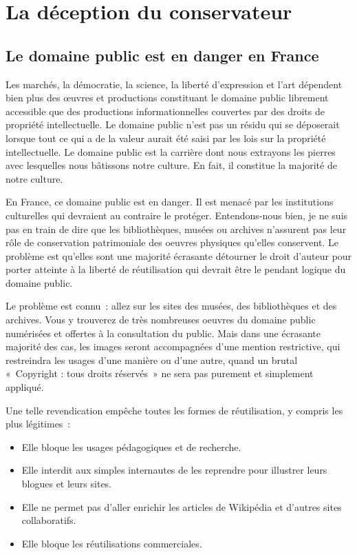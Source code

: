 \chapter{La déception du conservateur}\label{conserv}
\section{Le domaine public est en danger en France}
Les marchés, la démocratie, la science, la liberté d'expression et l'art dépendent bien plus des œuvres et productions constituant le domaine public librement accessible que des productions informationnelles couvertes par des droits de propriété intellectuelle. Le domaine public n'est pas un résidu qui se déposerait lorsque tout ce qui a de la valeur aurait été saisi par les lois sur la propriété intellectuelle. Le domaine public est la carrière dont nous extrayons les pierres avec lesquelles nous bâtissons notre culture. En fait, il constitue la majorité de notre culture.

En France, ce domaine public est en danger. Il est menacé par les institutions culturelles qui devraient au contraire le protéger. Entendons-nous bien, je ne suis pas en train de dire que les bibliothèques, musées ou archives n’assurent pas leur rôle de conservation patrimoniale des oeuvres physiques qu’elles conservent. Le problème est qu'elles sont une majorité écrasante détourner le droit d'auteur pour porter atteinte à la liberté de réutilisation qui devrait être le pendant logique du domaine public.

Le problème est connu~: allez sur les sites des musées, des bibliothèques et des archives. Vous y trouverez de très nombreuses oeuvres du domaine public numérisées et offertes à la consultation du public. Mais dans une écrasante majorité des cas, les images seront accompagnées d’une mention restrictive, qui restreindra les usages d’une manière ou d’une autre, quand un brutal «~Copyright : tous droits réservés~» ne sera pas purement et simplement appliqué.

Une telle revendication empêche toutes les formes de réutilisation, y compris les plus légitimes~: 

\begin{itemize}
\item Elle bloque les usages pédagogiques et de recherche.
\item Elle interdit aux simples internautes de les reprendre pour illustrer leurs blogues et leurs sites. 
\item Elle ne permet pas d’aller enrichir les articles de Wikipédia et d’autres sites collaboratifs. 
\item Elle bloque les réutilisations commerciales.
\end{itemize}

